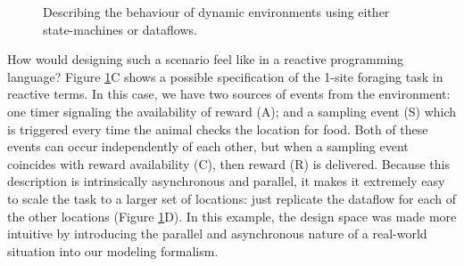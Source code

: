 \begin{figure}
\begin{center}
\end{center}
\vspace{-5mm}
\caption{Describing the behaviour of dynamic environments using either state-machines or dataflows.}
\label{fig:bonsaiStateMachine}
\end{figure}

How would designing such a scenario feel like in a reactive programming language? Figure \ref{fig:bonsaiStateMachine}C shows a possible specification of the 1-site foraging task in reactive terms. In this case, we have two sources of events from the environment: one timer signaling the availability of reward (A); and a sampling event (S) which is triggered every time the animal checks the location for food. Both of these events can occur independently of each other, but when a sampling event coincides with reward availability (C), then reward (R) is delivered. Because this description is intrinsically asynchronous and parallel, it makes it extremely easy to scale the task to a larger set of locations: just replicate the dataflow for each of the other locations (Figure \ref{fig:bonsaiStateMachine}D). In this example, the design space was made more intuitive by introducing the parallel and asynchronous nature of a real-world situation into our modeling formalism.

